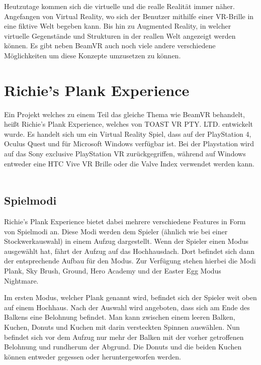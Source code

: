 
%

Heutzutage kommen sich die virtuelle und die realle Realität immer näher.
Angefangen von Virtual Reality, wo sich der Benutzer mithilfe einer VR-Brille in eine fiktive Welt begeben kann.
Bis hin zu Augmented Reality, in welcher virtuelle Gegenstände und Strukturen in der reallen Welt angezeigt werden können.
Es gibt neben BeamVR auch noch viele andere verschiedene M\"oglichkeiten um diese Konzepte umzusetzen zu können.
\cite{Jabil_FutureOfARVR_2021}


\section{Richie's Plank Experience}
\label{sec:richiesplankexperience}
Ein Projekt welches zu einem Teil das gleiche Thema wie BeamVR behandelt, heißt Richie's Plank Experience, welches von TOAST VR PTY. LTD. entwickelt wurde.
Es handelt sich um ein Virtual Reality Spiel, dass auf der PlayStation 4, Oculus Quest und f\"ur Microsoft Windows verf\"ugbar ist.
Bei der Playstation wird auf das Sony exclusive PlayStation VR zur\"uckgegriffen, während auf Windows entweder eine HTC Vive VR Brille oder die Valve Index verwendet werden kann.
~\cite{ToastGames_2021}

\subsection{Spielmodi}
\label{sec:richiesplankexperience_modes}
Richie's Plank Experience bietet dabei mehrere verschiedene Features in Form von Spielmodi an.
Diese Modi werden dem Spieler (\"ahnlich wie bei einer Stockwerkauswahl) in einem Aufzug dargestellt.
Wenn der Spieler einen Modus ausgewählt hat, fährt der Aufzug auf das Hochhausdach.
Dort befindet sich dann der entsprechende Aufbau für den Modus.
Zur Verfügung stehen hierbei die Modi Plank, Sky Brush, Ground, Hero Academy und der Easter Egg Modus Nightmare.
~\cite{ToastGames_2021_Steam}

Im ersten Modus, welcher Plank genannt wird, befindet sich der Spieler weit oben auf einem Hochhaus.
Nach der Auswahl wird angeboten, dass sich am Ende des Balkens eine Belohnung befindet.
Man kann zwischen einem leeren Balken, Kuchen, Donuts und Kuchen mit darin versteckten Spinnen auswählen.
Nun befindet sich vor dem Aufzug nur mehr der Balken mit der vorher getroffenen Belohnung und rundherum der Abgrund.
Die Donuts und die beiden Kuchen können entweder gegessen oder heruntergeworfen werden.
~\cite{ToastGames_2021_Steam}

